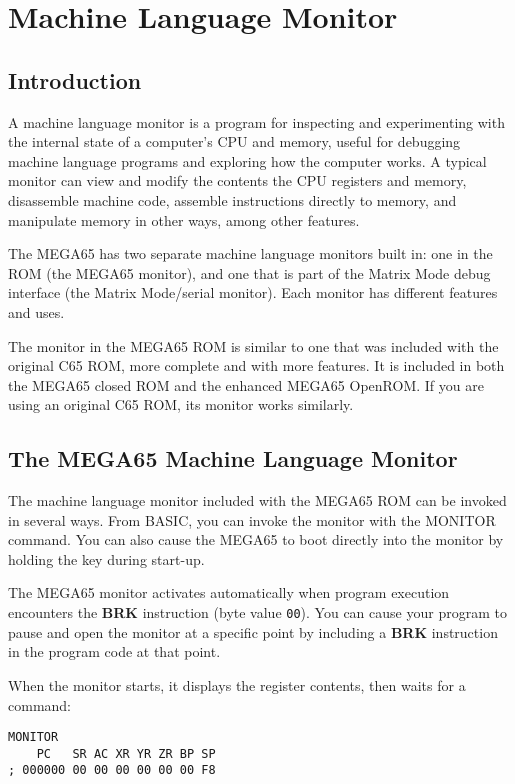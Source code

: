 \chapter{Machine Language Monitor}

\section{Introduction}

A machine language monitor is a program for inspecting and experimenting with the internal state of a computer's CPU and memory, useful for debugging machine language programs and exploring how the computer works. A typical monitor can view and modify the contents the CPU registers and memory, disassemble machine code, assemble instructions directly to memory, and manipulate memory in other ways, among other features.

The MEGA65 has two separate machine language monitors built in: one in the ROM (the MEGA65 monitor), and one that is part of the Matrix Mode debug interface (the Matrix Mode/serial monitor). Each monitor has different features and uses.

The monitor in the MEGA65 ROM is similar to one that was included with the original C65 ROM, more complete and with more features. It is included in both the MEGA65 closed ROM and the enhanced MEGA65 OpenROM. If you are using an original C65 ROM, its monitor works similarly.


\section{The MEGA65 Machine Language Monitor}

The machine language monitor included with the MEGA65 ROM can be invoked in several ways. From BASIC, you can invoke the monitor with the {\screentext MONITOR} command. You can also cause the MEGA65 to boot directly into the monitor by holding the  key during start-up.

The MEGA65 monitor activates automatically when program execution encounters the {\bf BRK} instruction (byte value {\tt 00}). You can cause your program to pause and open the monitor at a specific point by including a {\bf BRK} instruction in the program code at that point.

When the monitor starts, it displays the register contents, then waits for a command:

\begin{tcolorbox}[colback=blue,coltext=white]
\verbatimfont{\codefont}
\begin{verbatim}
MONITOR
    PC   SR AC XR YR ZR BP SP
; 000000 00 00 00 00 00 00 F8
\end{verbatim}
\end{tcolorbox}


